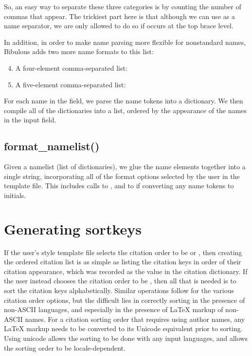 \documentclass[letterpaper,10pt,english]{sphinxmanual}
\begin{document}
So, an easy way to separate these three categories is by counting the number of commas that appear. The trickiest part here is that although we can use  as a name separator, we are only allowed to do so if  occurs at the top brace level.

In addition, in order to make name parsing more flexible for nonstandard names, Bibulous adds two more name formats to this list:
\begin{enumerate}
\setcounter{enumi}{3}
\item {} 
A four-element comma-separated list: 

\item {} 
A five-element comma-separated list: 

\end{enumerate}

For each name in the field, we parse the name tokens into a dictionary. We then compile all of the dictionaries into a list, ordered by the appearance of the names in the input field.


\subsection{format\_namelist()}
\label{\detokenize{developer_guide:format-namelist}}
Given a namelist (list of dictionaries), we glue the name elements together into a single string, incorporating all of the format options selected by the user in the template file. This includes calls to , and to  if converting any name tokens to initials.


\section{Generating sortkeys}
\label{\detokenize{developer_guide:generating-sortkeys}}
If the user’s style template file selects the citation order to be  or , then creating the ordered citation list is as simple as listing the citation keys in order of their citation appearance, which was recorded as the value in the citation dictionary. If the user instead chooses the citation order to be , then all that is needed is to sort the citation keys alphabetically. Similar operations follow for the various citation order options, but the difficult lies in correctly sorting in the presence of non-ASCII languages, and especially in the presence of LaTeX markup of non-ASCII names. For a citation sorting order that requires using author names, any LaTeX markup needs to be converted to its Unicode equivalent prior to sorting. Using unicode allows the sorting to be done with any input languages, and allows the sorting order to be locale-dependent.
\end{document}
